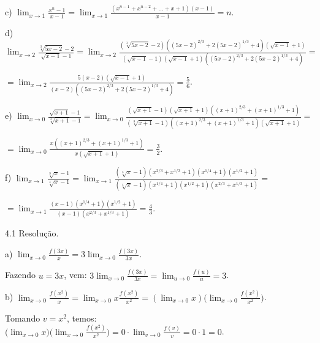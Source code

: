 \documentclass{article}
\begin{document}
{\begin{newpage}
\par
\vspace{0.3cm}
c) $\displaystyle{\lim_{x\to 1} \frac{x^n - 1}{x - 1} = \lim_{x\to 1} \frac{(x^{n-1} +  x^{n-2} + ... + x + 1)(x-1)}{x-1} = n}$.
\par
\vspace{0.3cm}
d) $\displaystyle{\lim_{x\to 2} \frac{\sqrt[3]{5x - 2} - 2}{\sqrt{x - 1} - 1} = \lim_{x\to 2} \frac{(\sqrt[3]{5x - 2} - 2)((5x-2)^{2/3} + 2(5x - 2)^{1/3} + 4)(\sqrt{x-1} + 1)}{(\sqrt{x-1} - 1)(\sqrt{x-1} + 1)((5x-2)^{2/3} + 2(5x - 2)^{1/3} + 4)}} =$ \par $= \displaystyle{\lim_{x\to 2} \frac{5(x-2)(\sqrt{x-1} + 1)}{(x-2)((5x-2)^{2/3} + 2(5x - 2)^{1/3} + 4)} = \frac{5}{6}}$.
\par
\vspace{0.3cm}
e) $\displaystyle{\lim_{x\to 0} \frac{\sqrt{x+1} - 1}{\sqrt[3]{x+1} - 1} = \lim_{x\to 0} \frac{(\sqrt{x+1} - 1)(\sqrt{x+1} + 1)((x+1)^{2/3} + (x+1)^{1/3} + 1)}{(\sqrt[3]{x+1} - 1)((x+1)^{2/3} + (x+1)^{1/3} + 1)(\sqrt{x+1} + 1)}} =$ \par  $=\displaystyle{\lim_{x\to 0} \frac{x((x+1)^{2/3} + (x+1)^{1/3} + 1)}{x(\sqrt{x+1} + 1)} = \frac{3}{2}}$.
\par
\vspace{0.3cm}
f) $\displaystyle{\lim_{x\to 1}} \frac{\sqrt[3]{x} - 1}{\sqrt[4]{x} - 1}=\displaystyle{\lim_{x\to 1}} \frac{(\sqrt[3]{x} - 1)(x^{2/3} + x^{1/3} + 1)(x^{1/4} + 1)(x^{1/2} + 1)}{(\sqrt[4]{x} - 1)(x^{1/4} + 1)(x^{1/2} + 1)(x^{2/3} + x^{1/3} + 1)}=$ \par  $=\displaystyle{\lim_{x\to 1} \frac{(x-1)(x^{1/4} + 1)(x^{1/2} + 1)}{(x-1)(x^{2/3} + x^{1/3} + 1)}= \frac{4}{3}}$.
\par
\vspace{0.3cm}
\begin{flushleft}
4.1 Resolução.
\end{flushleft}
\par
a) $\displaystyle{\lim_{x\to 0} \frac{f(3x)}{x} = 3 \lim_{x\to 0} \frac{f(3x)}{3x}}$.
\par Fazendo $u=3x$, vem: $3 \displaystyle{\lim_{x\to 0} \frac{f(3x)}{3x} = \lim_{u\to 0} \frac{f(u)}{u} = 3}$.
\par
\vspace{0.3cm}
b) $\displaystyle{\lim_{x\to 0} \frac{f(x^2)}{x} = \lim_{x\to 0} x\frac{f(x^2)}{x^2} = (\lim_{x\to 0} x)\Big(\lim_{x\to 0} \frac{f(x^2)}{x^2}\Big)}$.
\vspace{0.3cm}
\par Tomando $v=x^{2}$, temos: $(\displaystyle{\lim_{x\to 0} x)\Big(\lim_{x\to 0} \frac{f(x^2)}{x^2}\Big) = 0\cdot\lim_{v\to 0} \frac{f(v)}{v} = 0\cdot 1 = 0}$.

\end{newpage}}
\end{document}

